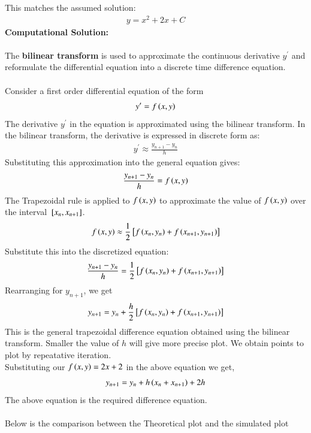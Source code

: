 \documentclass[journal]{IEEEtran}
\begin{document}
This matches the assumed solution:
\begin{align}
    y = x^2 + 2x + C
\end{align}
\textbf{Computational Solution: }\\ \\
The \textbf{ bilinear transform} is used to approximate the continuous derivative $y^{\prime}$ and reformulate the differential equation into a discrete time difference equation.\\ \\
Consider a first order differential equation of the form
\begin{align}
    y^\prime = f\left(x,y\right)
\end{align}
The derivative $y^\prime$ in the equation is approximated using the bilinear transform. In the bilinear transform, the derivative is expressed in discrete form as: \\
\begin{align}
    y^\prime \approx \frac{y_{n+1} - y_n}{h}
\end{align}
Substituting this approximation into the general equation gives:
\begin{align}
    \frac{y_{n+1} - y_n}{h} = f\left(x,y\right)
\end{align}
The Trapezoidal rule is applied to $f\left(x,y\right)$ to approximate the value of $f\left(x,y\right)$ over the interval ${}\left[x_n,x_{n+1}\right]$.
\begin{align}
    f\left(x,y\right) \approx \frac{1}{2} {}\left[f\left(x_n,y_n\right) + f\left(x_{n+1},y_{n+1}\right)\right]
\end{align}
Substitute this into the discretized equation:
\begin{align}
    \frac{y_{n+1} - y_n}{h} = \frac{1}{2} {}\left[f\left(x_n,y_n\right) + f\left(x_{n+1},y_{n+1}\right)\right]
\end{align}
Rearranging for $y_{n+1}$, we get 
\begin{align}
    y_{n+1} = y_{n} + \frac{h}{2} {}\left[f\left(x_n,y_n\right) + f\left(x_{n+1},y_{n+1}\right)\right]
\end{align}
This is the general trapezoidal difference equation obtained using the bilinear transform.
Smaller the value of $h$ will give more precise plot. We obtain points to plot by repeatative iteration. \\
Substituting our $f\left(x,y\right) = 2x+2$ in the above equation we get,
\begin{align}
    y_{n+1} = y_{n} + h\left(x_{n} + x_{n+1}\right) + 2h 
\end{align}
The above equation is the required difference equation.\\ \\
Below is the comparison between the Theoretical plot and the simulated plot
\end{document}
